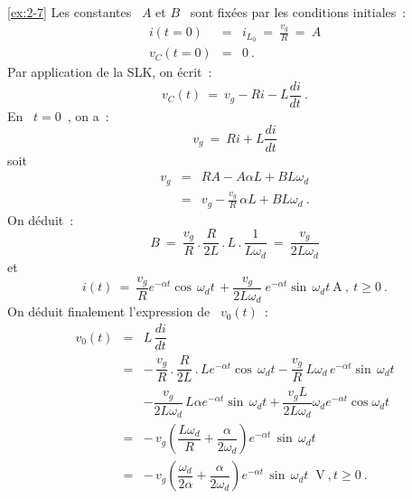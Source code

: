 \begin{solexercise}{\ref{ex:2-7}}
Les constantes \ $A$ et $B$ \ sont fix\'ees par les conditions initiales~:
\begin{eqnarray*}
	i(t=0) &=& i_{L_0} \: = \: \frac{v_g}{R}\: = \: A\\
	v_C(t=0) &=& 0~.
\end{eqnarray*}
Par application de la SLK, on \'ecrit~:
\[ v_C(t) \: = \: v_g - Ri - L\dfrac{di}{dt}~. \]
En \ $t=0$~, on a~:
\[ v_g \: = \: Ri + L\dfrac{di}{dt} \]
soit
\begin{eqnarray*}
	v_g &=& RA - A\alpha L + BL\omega_d\\
	&=& v_g - \frac{v_g}{R} \, \alpha L + BL\omega_d~.
\end{eqnarray*}
On d\'eduit~:
\[ B \: = \: \dfrac{v_g}{R} \, . \, \dfrac{R}
{2L} \, . \,L \, . \, \dfrac{1}{L\omega_d} \: = \: \dfrac{v_g}{2L\omega_d} \] 
et
\[ i(t) \: = \: \dfrac{v_g}{R} e^{-\alpha t}  \cos \, \omega_d t \,  +
\dfrac{v_g}{2L\omega_d} \:  e^{-\alpha t}  \sin \, \omega_d t ~\mbox{A}~, ~t\geq 0~. \]
On d\'eduit finalement l'expression de \ $v_0(t)$~:
\begin{eqnarray*}
	v_0(t) &=& L \, \dfrac{di}{dt}\\[2mm]
	&=& -\, \dfrac{v_g}{R} \, . \, \dfrac{R}{2L} \, . \, L e^{-\alpha t} \cos \, \omega_d t 
	- \dfrac{v_g}{R} \, L\omega_d \, e^{-\alpha t} \sin \, \omega_d t\\[2mm]
	&&- \dfrac{v_g}{2L\omega_d} \, L \alpha  e^{-\alpha t} \sin\, \omega_d t 
	+ \dfrac{v_gL}{2L\omega_d}\omega_d e^{-\alpha t} \cos \omega_d t \\[2mm]
	&= & -\, v_g \left( \dfrac{L\omega_d}{R} + \dfrac{\alpha}{2\omega_d} \right) 
	e^{-\alpha t} \, \sin\, \omega_d t\\[2mm]
	&=& -\, v_g \left( \dfrac{\omega_d}{2\alpha} + 
	\dfrac{\alpha}{2\omega_d} \right) e^{-\alpha t} \, \sin\, \omega_d t ~\mbox{~V}~, t \geq 0~.
\end{eqnarray*}
\end{solexercise}

